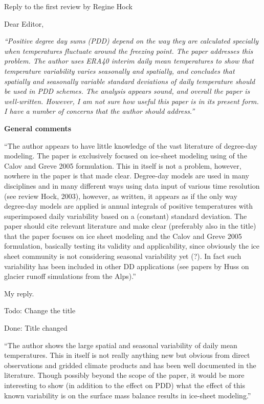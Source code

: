 \documentclass{letter}
\newcommand{\rev}[0]{\color{blue!50!black}\it}
\newcommand{\textrev}[1]{{\rev``#1''}}
\newcommand{\revpoint}[1]{{\rev\item``#1''}}
\newcommand{\todo}[1]{\textcolor{red!50!black}{Todo: #1}}
\newcommand{\done}[1]{\textcolor{green!50!black}{Done: #1}}
\begin{document}
\begin{letter}{Reply to the first review by Regine Hock}

\opening{Dear Editor,}

\textrev{Positive degree day sums (PDD) depend on the way they are calculated specially when temperatures fluctuate around the freezing point. The paper addresses this problem. The author uses ERA40 interim daily mean temperatures to show that temperature variability varies seasonally and spatially, and concludes that spatially and seasonally variable standard deviations of daily temperature should be used in PDD schemes. The analysis appears sound, and overall the paper is well-written. However, I am not sure how useful this paper is in its present form. I have a number of concerns that the author should address.}


\textbf{General comments}

\begin{enumerate}[resume]

    \revpoint{The author appears to have little knowledge of the vast literature of degree-day modeling. The paper is exclusively focused on ice-sheet modeling using of the Calov and Greve 2005 formulation. This in itself is not a problem, however, nowhere in the paper is that made clear. Degree-day models are used in many disciplines and in many different ways using data input of various time resolution (see review Hock, 2003), however, as written, it appears as if the only way degree-day models are applied is annual integrals of positive temperatures with superimposed daily variability based on a (constant) standard deviation. The paper should cite relevant literature and make clear (preferably also in the title) that the paper focuses on ice sheet modeling and the Calov and Greve 2005 formulation, basically testing its validity and applicability, since obviously the ice sheet community is not considering seasonal variability yet (?). In fact such variability has been included in other DD applications (see papers by Huss on glacier runoff simulations from the Alps).}

    My reply.

    \todo{Change the title}

    \done{Title changed}

    \revpoint{The author shows the large spatial and seasonal variability of daily mean temperatures. This in itself is not really anything new but obvious from direct observations and gridded climate products and has been well documented in the literature. Though possibly beyond the scope of the paper, it would be more interesting to show (in addition to the effect on PDD) what the effect of this known variability is on the surface mass balance results in ice-sheet modeling.}


\end{enumerate}
\end{letter}
\end{document}
